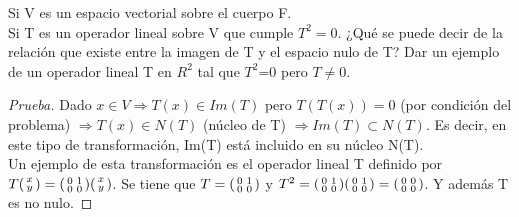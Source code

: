 \documentclass[12pt]{article}
\newenvironment{problem}[2][Problem]{\begin{trivlist}
\item[\hskip \labelsep {\bfseries #1}\hskip \labelsep {\bfseries #2.}]}{\end{trivlist}}
\newenvironment{xmat}
  {\left(\begin{smallmatrix}}
  {\end{smallmatrix}\right)}
\begin{document}
\begin{problem}[Problema]{2}
\end{problem}
\begin{problem}[Problema]{2.a}
Si V es un espacio vectorial sobre el cuerpo F. \\
Si T es un operador lineal sobre V que cumple $T^{2}=0$. ¿Qué se puede decir de la relación que existe entre la imagen de T y el espacio nulo de T? Dar un ejemplo de un operador lineal T en $R^{2}$ tal que $T^{2}$=0 pero $T\neq0$.
\end{problem}
 
\begin{proof}[Prueba]
Dado $x \in V \Longrightarrow T(x) \in Im(T)$ pero $T(T(x))= 0$ (por condición del problema) $\Longrightarrow T(x) \in N(T)$ (núcleo de T) $\Longrightarrow Im(T) \subset N(T)$. Es decir, en este tipo de transformación, Im(T) está incluido en su núcleo N(T).\\
Un ejemplo de esta transformación es el operador lineal T definido por $T\begin{xmat}x \\y\end{xmat} = \begin{xmat}0 & 1\\0 & 0\end{xmat}\begin{xmat}x \\y\end{xmat}$. Se tiene que $T=\begin{xmat}0 & 1\\0 & 0\end{xmat}$ y $T^{2}=\begin{xmat}0 & 1\\0 & 0\end{xmat}\begin{xmat}0 & 1\\0 & 0\end{xmat}=\begin{xmat}0 & 0\\0 & 0\end{xmat}$. Y además T es no nulo.
\end{proof}
\end{document}
